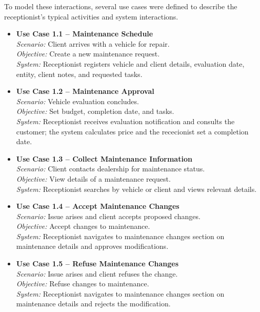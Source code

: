 To model these interactions, several use cases were defined to describe the receptionist's typical activities and system interactions.


\begin{itemize}
    \item \textbf{Use Case 1.1 – Maintenance Schedule}\\
    \textit{Scenario:} Client arrives with a vehicle for repair.\\
    \textit{Objective:} Create a new maintenance request.\\
    \textit{System:} Receptionist registers vehicle and client details, evaluation date, entity, client notes, and requested tasks.
    \item \textbf{Use Case 1.2 – Maintenance Approval}\\
    \textit{Scenario:} Vehicle evaluation concludes.\\
    \textit{Objective:} Set budget, completion date, and tasks.\\
    \textit{System:} Receptionist receives evaluation notification and consults the customer; the system calculates price and the rececionist set a completion date.
    \item \textbf{Use Case 1.3 – Collect Maintenance Information}\\
    \textit{Scenario:} Client contacts dealership for maintenance status.\\
    \textit{Objective:} View details of a maintenance request.\\
    \textit{System:} Receptionist searches by vehicle or client and views relevant details.
    \item \textbf{Use Case 1.4 – Accept Maintenance Changes}\\
    \textit{Scenario:} Issue arises and client accepts proposed changes.\\
    \textit{Objective:} Accept changes to maintenance.\\
    \textit{System:} Receptionist navigates to maintenance changes section on maintenance details and approves modifications.
    \item \textbf{Use Case 1.5 – Refuse Maintenance Changes}\\
    \textit{Scenario:} Issue arises and client refuses the change.\\
    \textit{Objective:} Refuse changes to maintenance.\\
    \textit{System:} Receptionist navigates to maintenance changes section on maintenance details and rejects the modification.

\end{itemize}
